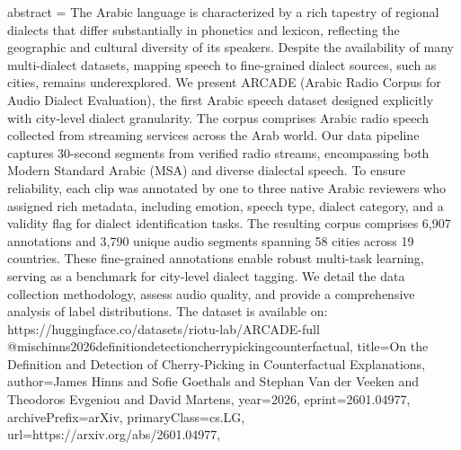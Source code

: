 {      abstract = {The Arabic language is characterized by a rich tapestry of regional dialects that differ substantially in phonetics and lexicon, reflecting the geographic and cultural diversity of its speakers. Despite the availability of many multi-dialect datasets, mapping speech to fine-grained dialect sources, such as cities, remains underexplored. We present ARCADE (Arabic Radio Corpus for Audio Dialect Evaluation), the first Arabic speech dataset designed explicitly with city-level dialect granularity. The corpus comprises Arabic radio speech collected from streaming services across the Arab world. Our data pipeline captures 30-second segments from verified radio streams, encompassing both Modern Standard Arabic (MSA) and diverse dialectal speech. To ensure reliability, each clip was annotated by one to three native Arabic reviewers who assigned rich metadata, including emotion, speech type, dialect category, and a validity flag for dialect identification tasks. The resulting corpus comprises 6,907 annotations and 3,790 unique audio segments spanning 58 cities across 19 countries. These fine-grained annotations enable robust multi-task learning, serving as a benchmark for city-level dialect tagging. We detail the data collection methodology, assess audio quality, and provide a comprehensive analysis of label distributions. The dataset is available on: https://huggingface.co/datasets/riotu-lab/ARCADE-full}
}@misc{hinns2026definitiondetectioncherrypickingcounterfactual,
      title={On the Definition and Detection of Cherry-Picking in Counterfactual Explanations}, 
      author={James Hinns and Sofie Goethals and Stephan Van der Veeken and Theodoros Evgeniou and David Martens},
      year={2026},
      eprint={2601.04977},
      archivePrefix={arXiv},
      primaryClass={cs.LG},
      url={https://arxiv.org/abs/2601.04977},
}
